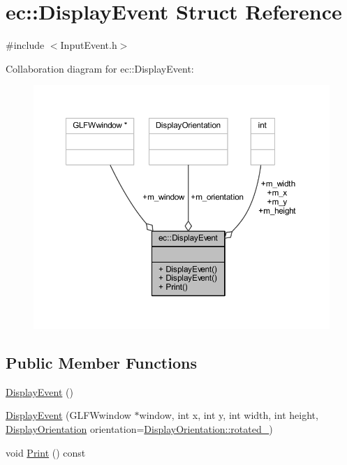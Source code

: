\hypertarget{structec_1_1_display_event}{}\section{ec\+:\+:Display\+Event Struct Reference}
\label{structec_1_1_display_event}


{\ttfamily \#include $<$Input\+Event.\+h$>$}



Collaboration diagram for ec\+:\+:Display\+Event\+:
\nopagebreak
\begin{figure}[H]
\begin{center}
\leavevmode
\includegraphics[width=350pt]{structec_1_1_display_event__coll__graph}
\end{center}
\end{figure}
\subsection*{Public Member Functions}
\begin{DoxyCompactItemize}
\item 
\mbox{\hyperlink{structec_1_1_display_event_a34ed8f096607ab02657e3599cd3d3211}{Display\+Event}} ()
\item 
\mbox{\hyperlink{structec_1_1_display_event_acccf560a2179011ec33b978ce3e8ceaf}{Display\+Event}} (G\+L\+F\+Wwindow $\ast$window, int x, int y, int width, int height, \mbox{\hyperlink{namespaceec_a1492d2e603a780e281848af6a4bad719}{Display\+Orientation}} orientation=\mbox{\hyperlink{namespaceec_a1492d2e603a780e281848af6a4bad719a138734ec961f603af1c8233366d1ec6d}{Display\+Orientation\+::rotated\+\_}})
\item 
void \mbox{\hyperlink{structec_1_1_display_event_af677820f4d527a797359eb6d344e97fc}{Print}} () const
\end{DoxyCompactItemize}
